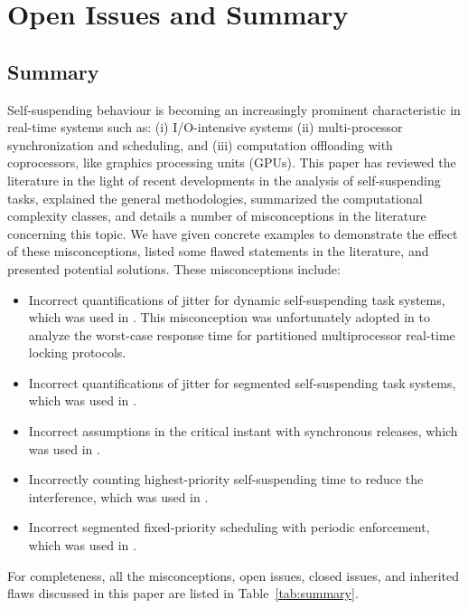 \section{Open Issues and Summary}
\subsection{Summary}  
 Self-suspending behaviour is becoming an increasingly prominent
characteristic in real-time systems such as: (i) I/O-intensive systems
(ii) multi-processor synchronization and scheduling, and (iii)
computation offloading with coprocessors, like graphics processing
units (GPUs).  This paper has reviewed the literature in the light of
recent developments in the analysis of self-suspending tasks,
explained the general methodologies, summarized the computational complexity classes, 
and details a number of 
misconceptions in the literature concerning this topic. We
have given concrete examples to demonstrate the effect of these
misconceptions, listed some flawed statements in the literature, and
presented potential solutions. These misconceptions include:
\begin{itemize}
\item Incorrect quantifications of jitter for dynamic self-suspending
  task systems, which was used in
  \cite{ECRTS-AudsleyB04,RTAS-AudsleyB04,RTCSA-KimCPKH95,MingLiRTCSA1994}.  This
  misconception was unfortunately adopted in
  \cite{zeng-2011,bbb-2013,yang-2013,kim-2014,han-2014,carminati-2014,yang-2014,lakshmanan-2009} to analyze the worst-case response time for
  partitioned multiprocessor real-time locking protocols.
\item Incorrect quantifications of jitter for segmented self-suspending
  task systems, which was used in  \cite{RTCSA-BletsasA05}.
\item Incorrect assumptions in the critical instant with
  synchronous releases, which was used in \cite{LR:rtas10}.
\item Incorrectly counting highest-priority self-suspending time to reduce the
  interference, which was used in  \cite{RTSS-KimANR13}. 
\item Incorrect segmented fixed-priority scheduling with periodic
  enforcement, which was used in \cite{RTSS-KimANR13,DBLP:journals/ieicet/DingTT09}.
\end{itemize}
For completeness, all the misconceptions, open issues, closed issues,
and inherited flaws discussed in this paper are listed in Table~\ref{tab:summary}.

